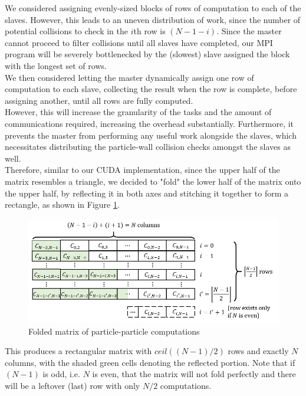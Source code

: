 \documentclass[12pt]{article}
\begin{document}
We considered assigning evenly-sized blocks of rows of computation to each of the slaves. However, this leads to an uneven distribution of work, since the number of potential collisions to check in the $i$th row is $(N - 1 - i)$. Since the master cannot proceed to filter collisions until all slaves have completed, our MPI program will be severely bottlenecked by the (slowest) slave assigned the block with the longest set of rows.\\

We then considered letting the master dynamically assign one row of computation to each slave, collecting the result when the row is complete, before assigning another, until all rows are fully computed.\\

However, this will increase the granularity of the tasks and the amount of communications required, increasing the overhead substantially. Furthermore, it prevents the master from performing any useful work alongside the slaves, which necessitates distributing the particle-wall collision checks amongst the slaves as well.\\

Therefore, similar to our CUDA implementation, since the upper half of the matrix resembles a triangle, we decided to "fold" the lower half of the matrix onto the upper half, by reflecting it in both axes and stitching it together to form a rectangle, as shown in Figure \ref{fig:collisionMatrixFolded}.

\begin{figure}[H]
    \centering
    \includegraphics[width=1.0\textwidth]{reportAssets/chap3ppCollisionMatrixFolded.png}
    \caption{Folded matrix of particle-particle computations}
    \label{fig:collisionMatrixFolded}
\end{figure}

This produces a rectangular matrix with $ceil((N - 1) / 2)$ rows and exactly $N$ columns, with the shaded green cells denoting the reflected portion. Note that if $(N - 1)$ is odd, i.e. $N$ is even, that the matrix will not fold perfectly and there will be a leftover (last) row with only $N / 2$ computations.\\
\end{document}
